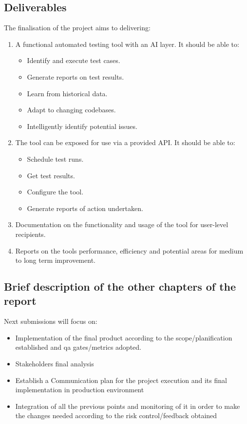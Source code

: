 \documentclass[a4paper, 12pt]{article}
\begin{document}
\subsection{Deliverables}
The finalisation of the project aims to delivering:
\begin{enumerate}
    \item A functional automated testing tool with an AI layer. It should be able to:
    \begin{itemize}
        \item Identify and execute test cases.
        \item Generate reports on test results.
        \item Learn from historical data.
        \item Adapt to changing codebases.
        \item Intelligently identify potential issues.
    \end{itemize}
    \item The tool can be exposed for use via a provided API. It should be able to:

    \begin{itemize}
        \item Schedule test runs.
        \item Get test results.
        \item Configure the tool.
        \item Generate reports of action undertaken.
    \end{itemize}

    \item Documentation on the functionality and usage of the tool for user-level recipients.
    \item Reports on the tools performance, efficiency and potential areas for medium to long term improvement.
\end{enumerate}
\subsection{ Brief description of the other chapters of the report}
Next submissions will focus on:
\begin{itemize}
    \item Implementation of the final product according to the scope/planification established and qa gates/metrics adopted.
    \item Stakeholders final analysis
    \item Establish a Communication plan for the project execution and its final implementation in production environment
    \item Integration of all the previous points and monitoring of it in order to make the changes needed according to the risk control/feedback obtained
\end{itemize}
\end{document}
